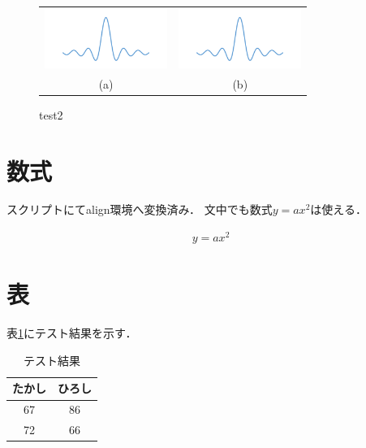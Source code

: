 \begin{figure}[ht]
\centering
\begin{tabular}[]{@{}cc@{}}

\includegraphics[width=4.00000cm]{./fig/sample.png} &
\includegraphics[width=4.00000cm]{./fig/sample.png}\\
(a) & (b)\\

\end{tabular}
\caption{test2}
\end{figure}

\section{数式}\label{ux6570ux5f0f}

スクリプトにてalign環境へ変換済み． 文中でも数式\(y=ax^2\)は使える．

\begin{align}
y=ax^2
\end{align}

\section{表}\label{ux8868}

表\ref{tab:test}にテスト結果を示す．

\begin{table}[ht]
\caption{テスト結果\label{tab:test}}
\centering
\begin{tabular}[]{@{}cc@{}}





\toprule
たかし & ひろし\\
\midrule

67 & 86\\
72 & 66\\
\bottomrule
\end{tabular}

\end{table}

